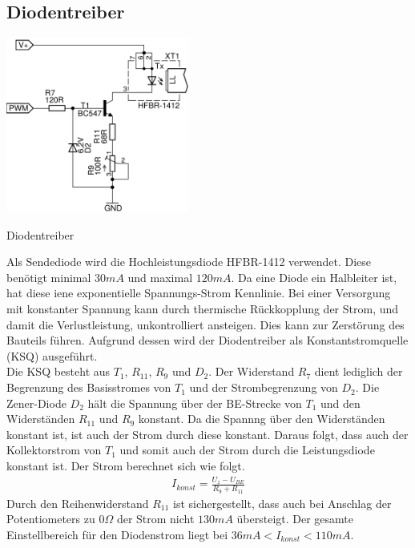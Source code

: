 \subsection{Diodentreiber}
\noindent
\begin{floatingfigure}[r]{6.5cm}
\includegraphics[width=6cm]{gfx/diodentreiber.pdf}
\caption{Diodentreiber}
\label{fig:comp}
\end{floatingfigure}
\noindent
Als Sendediode wird die Hochleistungsdiode \textsc{HFBR-1412} verwendet. Diese benötigt minimal $30mA$ und maximal $120mA$. Da eine Diode ein Halbleiter ist, hat diese iene exponentielle Span\-nungs-Strom Kennlinie. Bei einer Versorgung mit konstanter Spannung kann durch thermische Rückkopplung der Strom, und damit die Verlustleistung, unkontrolliert ansteigen. Dies kann zur Zer\-störung des Bauteils führen. Aufgrund dessen wird der Diodentreiber als Konstantstromquelle (KSQ) ausgeführt. \\
Die KSQ besteht aus $T_1$, $R_{11}$, $R_9$ und $D_2$. Der Widerstand $R_7$ dient lediglich der Begrenzung des Basisstromes von $T_1$ und der Strombegrenzung von $D_2$.
Die Zener-Diode $D_2$ hält die Spannung über der BE-Strecke von $T_1$ und den Widerständen $R_{11}$ und $R_9$ konstant. Da die Spannng über den Widerständen konstant ist, ist auch der Strom durch diese konstant. Daraus folgt, dass auch der Kollektorstrom von $T_1$ und somit auch der Strom durch die Leistungsdiode konstant ist.
Der Strom berechnet sich wie folgt.
\begin{align}
I_{konst} = \frac{U_z-U_{BE}}{R_9+R_{11}}
\end{align} 
Durch den Reihenwiderstand $R_{11}$	ist sichergestellt, dass auch bei Anschlag der Potentiometers zu $0\Omega$ der Strom nicht $130mA$ übersteigt. Der gesamte Einstellbereich für den Diodenstrom liegt bei $36mA < I_{konst}< 110mA$.
	
